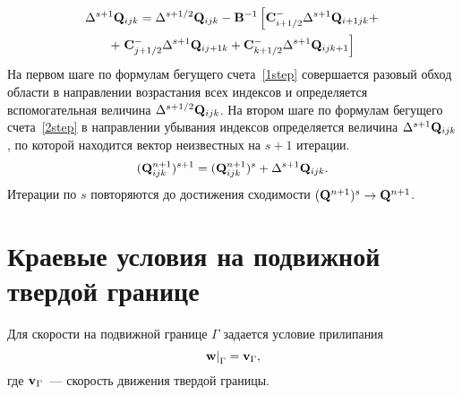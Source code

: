 \begin{gather}
  \Delta^{s+1} {\bf{Q}}_{ijk} = \Delta^{s+1/2} {\bf{Q}}_{ijk} - {\bf{B}}^{-1} 
  \left[ {\bf{C}}_{i + 1/2}^- \Delta^{s+1} {\bf{Q}}_{i+1jk} + \notag \right. \\ + \left.
  {\bf{C}}_{j+1/2}^- \Delta^{s+1} {\bf{Q}}_{ij+1k} + {\bf{C}}_{k+1/2}^- \Delta^{s+1} {\bf{Q}}_{ijk+1}\right]
  \label{2step}
\end{gather}
На первом шаге по формулам бегущего счета~\eqref{1step} совершается разовый обход области в направлении 
возрастания всех индексов и определяется вспомогательная величина $\Delta ^{s + 1/2} {\bf{Q}}_{ijk}$. 
На втором шаге по формулам бегущего счета~\eqref{2step} в направлении убывания индексов определяется 
величина $\Delta ^{s + 1} {\bf{Q}}_{ijk}$, по которой находится вектор неизвестных на $s+1$ итерации.
\begin{equation}
  ({\bf{Q}}_{ijk}^{n + 1} )^{s + 1}  = ({\bf{Q}}_{ijk}^{n + 1} )^s  + \Delta ^{s + 1} {\bf{Q}}_{ijk}. 
\end{equation}
Итерации по $s$ повторяются до достижения сходимости $({\bf{Q}}^{n + 1} )^s  \to {\bf{Q}}^{n + 1}$.

\section{Краевые условия на подвижной твердой границе}
\label{s:13}
Для скорости на подвижной границе $\Gamma$ задается условие прилипания
\begin{equation}
  \label{451}
  \left.{\bf{w}}\right|_\Gamma={\bf{v}}_\Gamma,
\end{equation}
где ${\bf{v}}_\Gamma$~--- скорость движения твердой границы.

